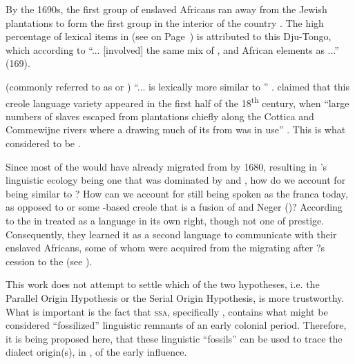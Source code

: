 By the 1690s, the first group of enslaved Africans ran away from the  Jewish plantations to form the first  group in the interior of the country \citep{Huber99}. The high percentage of  lexical items in  (see  on Page~\pageref{Table1.1}) is attributed to this Dju-Tongo, which according to \citet{Arends95} ``... [involved] the same mix of ,  and African elements as ...'' (169).

 (commonly referred to as  or ) ``... is lexically more similar to ''  \citep[Introduction]{Huttar94}. \citet{Huttar94} claimed that this creole language variety appeared in the first half of the 18\textsuperscript{th} century, when ``large numbers of slaves escaped from plantations chiefly along the Cottica and Commewijne rivers where a  drawing much of its  from  was in use'' \citep[Introduction]{Huttar94}. This  is what \citet{McWhorter98}  considered to be .

Since most of the  would have already migrated from  by 1680, resulting in 's linguistic ecology being one that was dominated by  and , how do we account for  being similar to ? How can we account for  still being spoken as the  franca today, as opposed to  or some -based creole that is a fusion of  and Neger  ()? According to \citet{Holm94} the  in  treated  as a language in its own right, though not one of prestige. Consequently, they learned it as a second language to communicate with their enslaved Africans, some of whom were acquired from the migrating  after ?s cession to the  (see ).

This work does not attempt to settle which of the two hypotheses, i.e. the Parallel Origin Hypothesis or the Serial Origin Hypothesis, is more trustworthy. What is important is the fact that \textsc{ssa}, specifically , contains what might be considered ``fossilized'' linguistic remnants of an early  colonial period. Therefore, it is being proposed here, that these linguistic ``fossils'' can be used to trace the dialect origin(s), in , of the early  influence.

